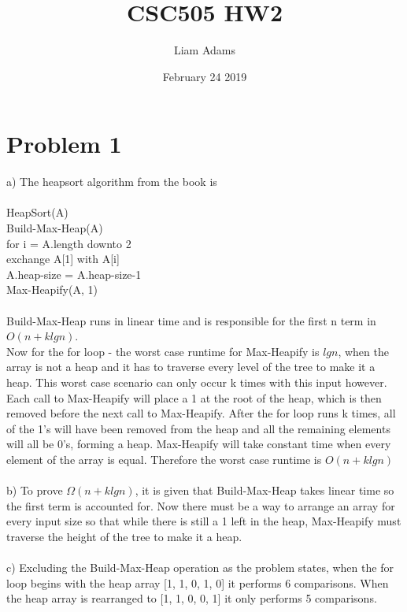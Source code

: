 \documentclass{article}
\title{CSC505 HW2}
\author{Liam Adams}
\date{February 24 2019}
\begin{document}
\maketitle

\section*{Problem 1}
a) The heapsort algorithm from the book is \\\\
HeapSort(A)\\
\-\hspace{1cm}Build-Max-Heap(A)\\
\-\hspace{1cm}for i = A.length downto 2\\
\-\hspace{2cm}exchange A[1] with A[i]\\
\-\hspace{2cm}A.heap-size = A.heap-size-1\\
\-\hspace{2cm}Max-Heapify(A, 1)\\\\
Build-Max-Heap runs in linear time and is responsible for the first n term in $O(n + klgn)$.\\ Now for the for loop - the worst case runtime for Max-Heapify is $lgn$, when the array is not a heap and it has to traverse every level of the tree to make it a heap.  This worst case scenario can only occur k times with this input however.  Each call to Max-Heapify will place a 1 at the root of the heap, which is then removed before the next call to Max-Heapify.  After the for loop runs k times, all of the 1's will have been removed from the heap and all the remaining elements will all be 0's, forming a heap.  Max-Heapify will take constant time when every element of the array is equal.  Therefore the worst case runtime is $O(n + klgn)$\\\\
b) To prove $\Omega(n + klgn)$, it is given that Build-Max-Heap takes linear time so the first term is accounted for. Now there must be a way to arrange an array for every input size so that while there is still a 1 left in the heap, Max-Heapify must traverse the height of the tree to make it a heap.\\\\
c) Excluding the Build-Max-Heap operation as the problem states, when the for loop begins with the heap array [1, 1, 0, 1, 0] it performs 6 comparisons.  When the heap array is rearranged to [1, 1, 0, 0, 1] it only performs 5 comparisons.\\\\
\end{document}
